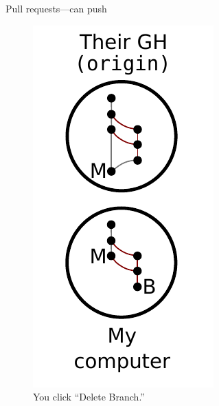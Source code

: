 \begin{frame}{Pull requests---can push}
  \begin{figure}
    \includegraphics{push_012.pdf}
    \\ You click ``Delete Branch.''
    \\ \texttt{}
  \end{figure}
\end{frame}

